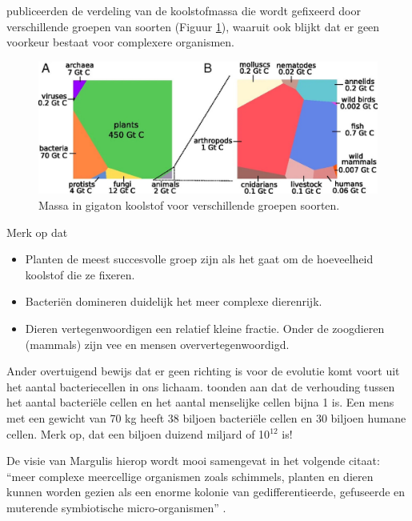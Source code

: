 \documentclass[
  11pt,
]{book}
\begin{document}
\citet{Bar-On2018} publiceerden de verdeling van de koolstofmassa die wordt gefixeerd door verschillende groepen van soorten (Figuur \ref{fig:carbonFixated}), waaruit ook blijkt dat er geen voorkeur bestaat voor complexere organismen.



\begin{figure}

{\centering \includegraphics[width=1\linewidth]{./figs/pnas.1711842115fig01} 

}

\caption{Massa in gigaton koolstof voor verschillende groepen soorten. \citep{Bar-On2018}}\label{fig:carbonFixated}
\end{figure}

Merk op dat

\begin{itemize}
\item
  Planten de meest succesvolle groep zijn als het gaat om de hoeveelheid koolstof die ze fixeren.
\item
  Bacteriën domineren duidelijk het meer complexe dierenrijk.
\item
  Dieren vertegenwoordigen een relatief kleine fractie. Onder de zoogdieren (mammals) zijn vee en mensen oververtegenwoordigd.
\end{itemize}

Ander overtuigend bewijs dat er geen richting is voor de evolutie komt voort uit het aantal bacteriecellen in ons lichaam. \citet{Sender2016} toonden aan dat de verhouding tussen het aantal bacteriële cellen en het aantal menselijke cellen bijna 1 is. Een mens met een gewicht van 70 kg heeft 38 biljoen bacteriële cellen en 30 biljoen humane cellen. Merk op, dat een biljoen duizend miljard of 10\(^{12}\) is!

De visie van Margulis hierop wordt mooi samengevat in het volgende citaat: ``meer complexe meercellige organismen zoals schimmels, planten en dieren kunnen worden gezien als een enorme kolonie van gedifferentieerde, gefuseerde en muterende symbiotische micro-organismen'' \citep{margulis1999}.
\end{document}
